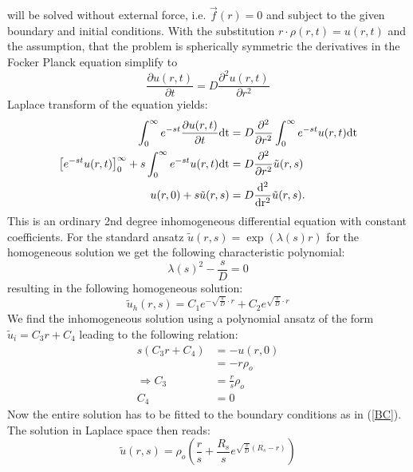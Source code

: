will be solved without external force, i.e. $\vec f(r) = 0$ and subject to the given boundary and initial conditions.
With the substitution $r \cdot \rho(r,t) = u(r,t)$ and the assumption, that the problem is spherically symmetric the derivatives in the Focker Planck equation simplify to
\begin{equation}
    \frac{\partial u(r,t)}{\partial t} = D \frac{\partial ^2 u(r,t)}{\partial r^2}
    \label{Simplified FPE}
\end{equation}
Laplace transform of the equation yields:
\begin{align}
    \int_0^\infty e^{-st}\frac{\partial u(r,t)}{\partial t} \rm{d} t &= D \frac{\partial ^2 }{\partial r^2} \int_0^\infty e^{-st} u(r,t) \rm{d} t \\
    \left[e^{-st} u(r,t) \right]_0^\infty + s \int_0^\infty e^{-st} u(r,t) \rm{d} t &= D \frac{\partial^2}{\partial r^2} \tilde{u}(r,s)\\
    u(r,0) + s \tilde{u}(r,s) &= D \frac{\rm{d}^2}{\rm{d} r^2} \tilde{u}(r,s).
\end{align}
This is an ordinary 2nd degree inhomogeneous differential equation with constant coefficients.
For the standard ansatz $\tilde{u}(r,s) = \exp(\lambda(s) r)$ for the homogeneous solution we get the following characteristic polynomial:
\begin{equation}
    \lambda(s) ^2 - \frac{s}{D} = 0
    \label{}
\end{equation}
resulting in the following homogeneous solution:
\begin{equation}
    \tilde{u}_h(r,s) = C_1 e^{ - \sqrt{\frac{s}{D}} \cdot r } + C_2 e^{ \sqrt{\frac{s}{D}} \cdot r }
    \label{u_h}
\end{equation}
We find the inhomogeneous solution using a polynomial ansatz of the form $\tilde{u}_i = C_3 r + C_4$ leading to the following relation:
\begin{align}
    s(C_3 r + C_4)  &= -u(r,0)\\
                    &= - r \rho_o \\
    \Rightarrow C_3 &= \frac{r}{s}\rho_o \\
                C_4 &= 0
\end{align}
Now the entire solution has to be fitted to the boundary conditions as in (\ref{BC}). The solution in Laplace space then reads:
\begin{equation}
\tilde{u}(r,s) = \rho_o \left( \frac{r}{s} + \frac{R_s}{s} e^{ \sqrt{\frac{s}{D}}(R_s - r) } \right) 
\end{equation}
